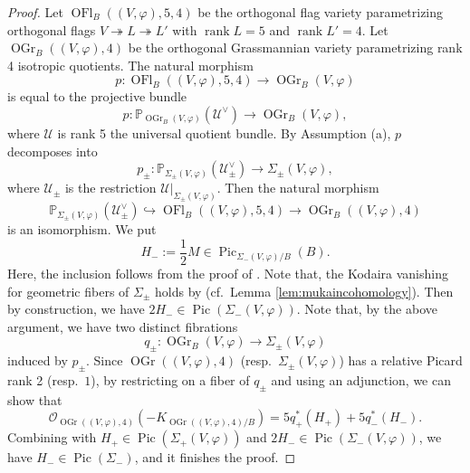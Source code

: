\documentclass[autodetect-engine, a4paper]{amsart}
\theoremstyle{definition}
\newcommand{\rank}{\mathop{\mathrm{rank}}}
\def\P{{\mathbb P}}
\def\cO{\mathcal{O}}
\DeclareMathOperator\Pic{\mathrm{Pic}}
\DeclareMathOperator\OGr{\mathrm{OGr}}
\DeclareMathOperator\OFl{\mathrm{OFl}}
\begin{document}
\begin{proof}
Let $\OFl_{B}((V,\varphi),5,4)$ be the orthogonal flag variety parametrizing orthogonal flags $V \twoheadrightarrow L \twoheadrightarrow L'$ with $\rank L =5$ and $\rank L'=4$.
Let $\OGr_{B} ((V,\varphi), 4)$ be the orthogonal Grassmannian variety parametrizing rank 4 isotropic quotients.
The natural morphism 
\[
p\colon \OFl_{B}((V,\varphi),5,4) \rightarrow \OGr_{B}(V,\varphi)
\]
is equal to the projective bundle
\[
p \colon
\P_{\OGr_{B}(V,\varphi)} (\mathcal{U}^{\vee})
\rightarrow
\OGr_{B}(V,\varphi),
\]
where $\mathcal{U}$ is rank 5 the universal quotient bundle.
By Assumption (a), $p$ decomposes into 
\[
p_{\pm} \colon
\P_{\Sigma_{\pm}(V,\varphi)} (\mathcal{U}_{\pm}^{\vee}) \rightarrow \Sigma_{\pm}(V,\varphi),
\]
where $\mathcal{U}_{\pm}$ is the restriction $\mathcal{U}|_{\Sigma_{\pm}(V,\varphi)}$.
Then the natural morphism
\[
\P_{\Sigma_{\pm}(V,\varphi)} (\mathcal{U}_{\pm}^{\vee})
\hookrightarrow 
\OFl_{B}((V,\varphi),5,4) \rightarrow \OGr_{B}((V,\varphi),4)
\]
is an isomorphism.
We put
\[
H_{-} := \frac{1}{2} M  \in \Pic_{\Sigma_{-}(V,\varphi)/B} (B).
\]
Here, the inclusion follows from the proof of \cite[Corollary 2.3]{Kuznetsovfamily}. Note that, the Kodaira vanishing for geometric fibers of $\Sigma_{\pm}$ holds by \cite[Proposition 2 and Theorem 2]{Mehta-Ramanathan} (cf.\ Lemma \ref{lem:mukaincohomology}).
Then by construction, we have $2H_{-} \in \Pic (\Sigma_{-} (V,\varphi))$.
Note that, by the above argument, we have two distinct fibrations
\[
q_{\pm} \colon
\OGr_{B} (V, \varphi) \rightarrow \Sigma_{\pm} (V, \varphi)
\]
induced by $p_{\pm}$.
Since $\OGr((V,\varphi),4)$ (resp.\ $\Sigma_{\pm}(V,\varphi)$) has a relative Picard rank 2 (resp.\ $1$), by restricting on a fiber of $q_{\pm}$ and using an adjunction, we can show that
\[
\cO_{\OGr((V,\varphi),4)} (-K_{\OGr((V,\varphi),4)/B} )= 5 q_{+}^{\ast}(H_{+}) + 5 q_{-}^{\ast} (H_{-}).
\]
Combining with $H_+ \in \Pic (\Sigma_{+}(V,\varphi))$ and $2 H_- \in \Pic(\Sigma_{-}(V,\varphi))$, we have $H_{-} \in \Pic (\Sigma_{-})$, and it finishes the proof.
\end{proof}
\end{document}
